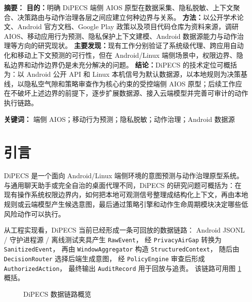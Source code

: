 \documentclass[12pt,a4paper]{article}
\begin{document}
\makecover
\clearpage
{}

{\hypersetup{linkcolor=black}\tableofcontents}
\newpage

\begin{dipecsabstract}
\noindent\textbf{ 摘要：}
\textbf{目的：}明确 DiPECS 端侧 AIOS 原型在数据采集、隐私脱敏、上下文聚合、决策路由与动作治理各层之间应建立何种边界与关系。
\textbf{方法：}以公开学术论文、Android 官方文档、Google Play 政策以及项目代码仓库为资料来源，调研 AIOS、移动应用行为预测、隐私保护上下文建模、Android 数据源能力与动作治理等方向的研究现状。
\textbf{主要发现：}现有工作分别验证了系统级代理、跨应用自动化和移动上下文预测的可行性，但在 Android/Linux 端侧场景中，权限边界、隐私边界和动作边界仍是未充分解决的问题。
\textbf{结论：}DiPECS 的技术定位可概括为：以 Android 公开 API 和 Linux 本机信号为默认数据源，以本地规则为决策基线，以隐私空气隙和策略审查作为核心约束的受控端侧 AIOS 原型；后续工作应在不破坏上述边界的前提下，逐步扩展数据源、接入云端模型并完善可审计的动作执行链路。

\vspace{0.5em}
\noindent\textbf{ 关键词：} 端侧 AIOS；移动行为预测；隐私脱敏；动作治理；Android 数据源
\end{dipecsabstract}

\section{引言}\label{sec:intro}

DiPECS 是一个面向 Android/Linux 端侧环境的意图预测与动作治理原型系统。
与通用聊天助手或完全自治的桌面代理不同，DiPECS 的研究问题可概括为：在现有操作系统权限边界内，如何把本地可观测信号整理成结构化上下文，再由本地规则或云端模型产生候选意图，最后通过策略引擎和动作生命周期模块决定哪些低风险动作可以执行。

从工程实现看，DiPECS 当前已经形成一条可回放的数据链路：
Android JSONL / 守护进程源 / 离线测试夹具产生 \texttt{RawEvent}，
经 \texttt{PrivacyAirGap} 转换为 \texttt{SanitizedEvent}，
再由 \texttt{WindowAggregator} 构造 \texttt{StructuredContext}，
随后由 \texttt{DecisionRouter} 选择后端生成意图，
经 \texttt{PolicyEngine} 审查后形成 \texttt{AuthorizedAction}，
最终输出 \texttt{AuditRecord} 用于回放与追责。
该链路可用图 \ref{fig:pipeline} 概括。

\begin{figure}[H]
  \centering
  \small
  \caption{DiPECS 数据链路概览}
  \label{fig:pipeline}
\end{figure}
\end{document}
